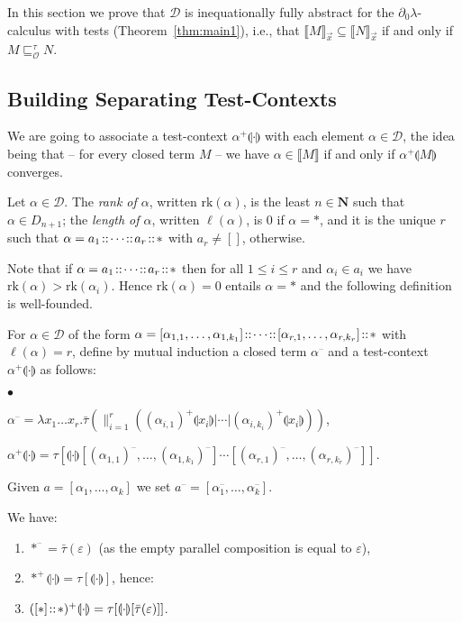 \documentclass{LMCS}
\newcommand{\nat}{\mathbf{N}}
\newcommand{\dzlam}{\ensuremath{\partial_0\lambda}}
\renewcommand{\hole}[1]{\llparenthesis #1\rrparenthesis}
\newcommand{\paral}{\vert}
\newcommand{\Tobsle}{\sqsubseteq^{\gt}_{\mathcal{O}}}
\newcommand{\rank}{\mathrm{rk}}
\newcommand{\len}{\ell}
\newcommand{\Int}[1]{\llbracket #1\rrbracket} \newcommand{\trm}[1]{#1^{\textrm{--}}}
\newcommand{\cont}[2]{#1^{+}\hole{#2}}
\newcommand{\seq}[1]{\vec{#1}}
\newcommand{\ga}{\alpha}
\newcommand{\gt}{\ensuremath{\tau}}
\newcommand{\gto}{\ensuremath{\bar\tau}}
\newcommand{\cD}{\mathcal{D}}
\begin{document}
In this section we prove that $\cD$ is inequationally fully abstract for the \dzlam-calculus with tests (Theorem~\ref{thm:main1}), i.e., that
$\Int{M}_{\seq x}\subseteq\Int{N}_{\seq x}$ if and only if $M\Tobsle N$.

\subsection{Building Separating Test-Contexts}

We are going to associate a 
test-context $\cont{\alpha}{\cdot}$ with each element $\alpha\in\cD$, 
the idea being that -- for every closed term $M$ --
we have $\alpha\in\Int{M}$ if and only if $\cont{\alpha}{M}$ converges. 

\begin{defi}
Let $\alpha\in \cD$.
The {\em rank of $\alpha$}, written $\rank(\alpha)$, is the least $n\in\nat$ such that $\alpha\in D_{n+1}$;
the \emph{length of $\alpha$}, written $\len(\alpha)$, is $0$ if
$\alpha=*$, and it is the unique  $r$ such that
$\alpha = a_1 \!::\! \cdots \!::\! a_r\!::\! *$
with $a_r \neq []$, otherwise.
\end{defi}
Note that if $\alpha = a_1 \!::\! \cdots \!::\! a_r \!::\! *$ then for all $1\le i\le r$ and $\alpha_i\in a_i$ 
we have $\rank(\alpha) > \rank(\alpha_i)$. 
Hence $\rank(\alpha) = 0$ entails $\alpha = *$ and the following definition is well-founded.

\begin{defi}\label{def:alpha+-}
For $\alpha\in\cD$ of the form
$\alpha = [\alpha_{1,1},\ldots,\alpha_{1,k_1}] \!::\! \cdots \!::\! [\alpha_{r,1},\ldots,\alpha_{r,k_r}]\!::\! *$ with $\len(\alpha) = r$, define by mutual induction  
a closed term $\trm{\alpha}$ and a test-context $\cont{\alpha}{\cdot}$ as follows:
\begin{iteMize}{$\bullet$}
\item $\trm{\alpha} = \lambda x_1\ldots x_r.\gto(\parallel_{i=1}^r (\cont{(\alpha_{i,1})}{x_i}\paral\cdots\paral\cont{(\alpha_{i,k_i})}{x_i}))$,
\item $\cont{\alpha}{\cdot} = \gt[\hole{\cdot}[\trm{(\alpha_{1,1})},\ldots,\trm{(\alpha_{1,k_1})}] \cdots [\trm{(\alpha_{r,1})},\ldots,\trm{(\alpha_{r,k_r})}]]$.
\end{iteMize}
Given $a = [\ga_1,\ldots,\ga_k]$ we set $\trm{a} = [\trm{\ga_1},\ldots,\trm{\ga_k}]$.
\end{defi}

\begin{exa} We have:
\begin{enumerate}[1.] 
\item $\trm{*} = \gto(\varepsilon)$ (as the empty parallel composition is equal to $\varepsilon$),
\item $\cont{*}{\cdot} = \gt[\hole{\cdot}]$, hence:
\item $\cont{([*]\at *)}{\cdot} = \gt[\hole{\cdot}[\gto(\varepsilon)]]$.
\end{enumerate}
\end{exa}
\end{document}
